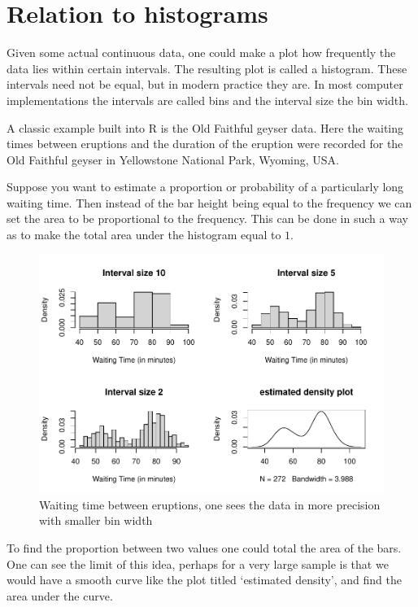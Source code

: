 \documentclass[
]{book}
\theoremstyle{definition}
\theoremstyle{definition}
\theoremstyle{definition}
\theoremstyle{definition}
\theoremstyle{remark}
\begin{document}
\hypertarget{relation-to-histograms}{%
\section{Relation to histograms}\label{relation-to-histograms}}

Given some actual continuous data, one could make a plot how frequently the data lies within certain intervals. The resulting plot is called a histogram. These intervals need not be equal, but in modern practice they are. In most computer implementations the intervals are called bins and the interval size the bin width.

A classic example built into R is the Old Faithful geyser data. Here the waiting times between eruptions and the duration of the eruption were recorded for the Old Faithful geyser in Yellowstone National Park, Wyoming, USA.

Suppose you want to estimate a proportion or probability of a particularly long waiting time. Then instead of the bar height being equal to the frequency we can set the area to be proportional to the frequency. This can be done in such a way as to make the total area under the histogram equal to \(1\).

\begin{figure}
\centering
\includegraphics{6G4Z3008-notes_files/figure-latex/faithful-1.pdf}
\caption{\label{fig:faithful}Waiting time between eruptions, one sees the data in more precision with smaller bin width}
\end{figure}

To find the proportion between two values one could total the area of the bars. One can see the limit of this idea, perhaps for a very large sample is that we would have a smooth curve like the plot titled `estimated density', and find the area under the curve.
\end{document}
